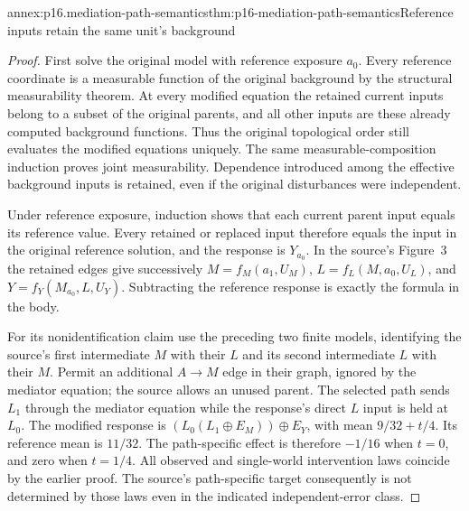 \begin{annexitem}{annex:p16.mediation-path-semantics}{thm:p16-mediation-path-semantics}{Reference inputs retain the same unit's background}
\begin{proof}
First solve the original model with reference exposure \(a_0\).
Every reference coordinate is a measurable function of the original
background by the structural measurability theorem. At every modified
equation the retained current inputs belong to a subset of the original
parents, and all other inputs are these already computed background
functions. Thus the original topological order still evaluates the
modified equations uniquely. The same measurable-composition induction
proves joint measurability. Dependence introduced among the effective
background inputs is retained, even if the original disturbances were
independent.

Under reference exposure, induction shows that each current parent
input equals its reference value. Every retained or replaced input
therefore equals the input in the original reference solution, and the
response is \(Y_{a_0}\). In the source's Figure~3 the retained edges
give successively \(M=f_M(a_1,U_M)\),
\(L=f_L(M,a_0,U_L)\), and \(Y=f_Y(M_{a_0},L,U_Y)\).
Subtracting the reference response is exactly the formula in the body.

For its nonidentification claim use the preceding two finite models,
identifying the source's first intermediate \(M\) with their \(L\)
and its second intermediate \(L\) with their \(M\). Permit an additional
\(A\to M\) edge in their graph, ignored by the mediator equation;
the source allows an unused parent. The selected path sends \(L_1\)
through the mediator equation while the response's direct \(L\) input
is held at \(L_0\). The modified response is
\((L_0(L_1\oplus E_M))\oplus E_Y\), with mean
\(9/32+t/4\). Its reference mean is \(11/32\). The path-specific
effect is therefore \(-1/16\) when \(t=0\), and zero when \(t=1/4\).
All observed and single-world intervention laws coincide by the earlier
proof. The source's path-specific target consequently is not determined
by those laws even in the indicated independent-error class.
\end{proof}
\end{annexitem}

